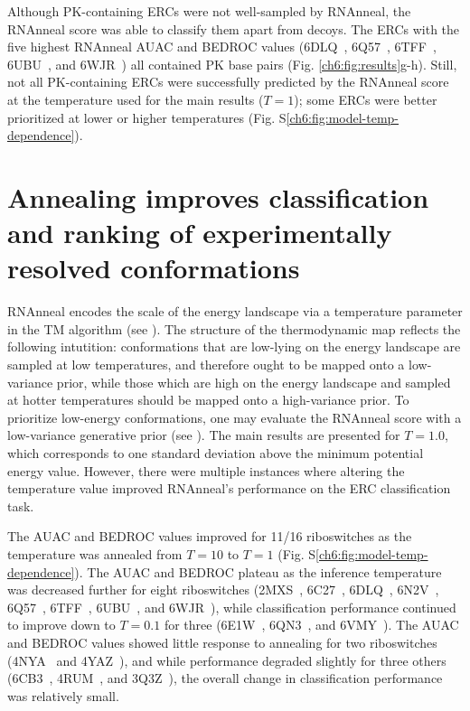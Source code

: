 Although PK-containing ERCs were not well-sampled by RNAnneal, the RNAnneal score was able to classify them apart from decoys. The ERCs with the five highest RNAnneal AUAC and BEDROC values (6DLQ~\cite{Peselis2018}, 6Q57~\cite{Dunstan2018},
6TFF~\cite{Huang2020}, 6UBU~\cite{Matyjasik2019}, and 6WJR~\cite{Wilt2020}) all contained PK base pairs (Fig. \ref{ch6:fig:results}g-h). Still, not all PK-containing ERCs were successfully predicted by the RNAnneal score at the temperature used for the main results ($T=1$); some ERCs were better prioritized at lower or higher temperatures (Fig. S\ref{ch6:fig:model-temp-dependence}).

\section{Annealing improves classification and ranking of experimentally resolved conformations}

RNAnneal encodes the scale of the energy landscape via a temperature parameter in the TM algorithm (see ). The structure of the thermodynamic map reflects the following intutition: conformations that are low-lying on the energy landscape are sampled at low temperatures, and therefore ought to be mapped onto a low-variance prior, while those which are high on the energy landscape and sampled at hotter temperatures should be mapped onto a high-variance prior. To prioritize low-energy conformations, one may evaluate the RNAnneal score with a low-variance generative prior (see ). The main results are presented for $T=1.0$, which corresponds to one standard deviation above the minimum potential energy value. However, there were multiple instances where altering the temperature value improved RNAnneal's performance on the ERC classification task.

The AUAC and BEDROC values improved for 11/16 riboswitches as the temperature was annealed from $T=10$ to $T=1$ (Fig. S\ref{ch6:fig:model-temp-dependence}). The AUAC and BEDROC plateau as the inference temperature was decreased further for eight riboswitches (2MXS~\cite{Schmidtke2015}, 6C27~\cite{Grigg2018}, 6DLQ~\cite{Peselis2018}, 6N2V~\cite{Price2018}, 6Q57~\cite{Dunstan2018}, 6TFF~\cite{Huang2020}, 6UBU~\cite{Matyjasik2019}, and 6WJR~\cite{Wilt2020}), while classification performance continued to improve down to $T=0.1$ for three (6E1W~\cite{Numata2019}, 6QN3~\cite{Huang2019}, and 6VMY~\cite{Chan2020}). The AUAC and BEDROC values showed little response to annealing for two riboswitches (4NYA~\cite{Warner2014} and 4YAZ~\cite{ren2015structural}), and while performance degraded slightly for three others (6CB3~\cite{Bachas2018}, 4RUM~\cite{Ramesh2014}, and 3Q3Z~\cite{Smith2010}), the overall change in classification performance was relatively small.

